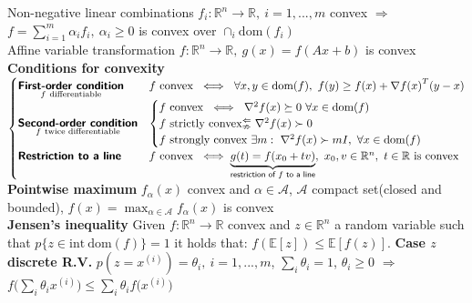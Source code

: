 \documentclass[a4paper]{article}
\begin{document}
\textsf{\small{Non-negative linear combinations}} {\small{
    $f_i:\mathbb{R}^n\to\mathbb{R}, \ i=1,...,m$ convex $\Rightarrow$ $f=\sum_{i=1}^m{\alpha_i f_i},\ \alpha_i\ge0$ is convex over $\cap
    _i{\text{dom}(f_i)}$
}}\\
\textsf{\small{Affine variable transformation}} {\small{
    $f:\mathbb{R}^n\to\mathbb{R}, \ g(x)=f(Ax+b)$ is convex 
}}\\
\textbf{Conditions for convexity} $\begin{cases}
    \underset{f \ \text{differentiable}}{\textsf{\textbf{First-order condition}}}& f \ \text{convex} \ \iff \ \forall{x,y}\in\text{dom}(f), \ f(y)\ge f(x)+\nabla{f(x)}^T(y-x)\\
    \underset{f \ \text{twice differentiable}}{\textsf{\textbf{Second-order condition}}}& \begin{cases}
        f \ \text{convex} \ \iff \ \nabla^2{f(x)}\succeq0 \ \forall x \in \text{dom}(f)\\
        f \ \text{strictly convex} \substack{\Leftarrow\\\nRightarrow} \ \nabla^2{f(x)}\succ0\\
        f \ \text{strongly convex} \ \exists{m}: \ \nabla^2{f(x)}\succ{m{I}}, \ \forall x \in \text{dom}(f)
    \end{cases}\\
    \textsf{\textbf{Restriction to a line}}& f \ \text{convex} \ \iff \underbrace{g(t)=f(x_0+tv)}_{\textsf{restriction of $f$ to a line}}, \ x_0,v\in\mathbb{R}^n, \ t \in \mathbb{R} \ \text{is convex}
\end{cases}$\\
\textbf{Pointwise maximum} $f_\alpha(x)$ convex and $\alpha\in\mathcal{A}$, $\mathcal{A}$ compact set(closed and bounded), $f(x)=\max_{\alpha\in\mathcal{A}}{f_\alpha(x)}$ is convex\\
\textbf{Jensen's inequality} Given $f:\mathbb{R}^n\to\mathbb{R}$ convex and $z\in\mathbb{R}^n$ a random variable such that $p\{z\in\text{int}\ {\text{dom}(f)}\}=1$ it holds that: $f(\mathbb{E}[z])\le\mathbb{E}[f(z)]$. \textbf{Case $z$ discrete R.V.} $p(z=x^{(i)})=\theta_i, \ i=1,...,m$, $\sum_i{\theta_i}=1$, $\theta_i\ge0$ $\Rightarrow$ $f\big(\sum_i{\theta_i{x^{(i)}}}\big)\le\sum_i{\theta_i{f\big(x^{(i)}\big)}}$\\
\end{document}
